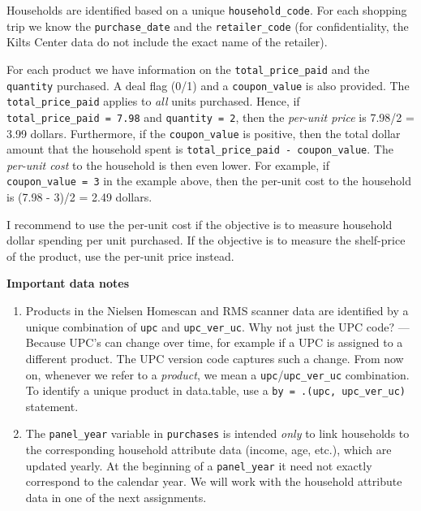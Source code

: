 \documentclass[
]{article}
\begin{document}
Households are identified based on a unique \texttt{household\_code}.
For each shopping trip we know the \texttt{purchase\_date} and the
\texttt{retailer\_code} (for confidentiality, the Kilts Center data do
not include the exact name of the retailer).

For each product we have information on the \texttt{total\_price\_paid}
and the \texttt{quantity} purchased. A deal flag (0/1) and a
\texttt{coupon\_value} is also provided. The \texttt{total\_price\_paid}
applies to \emph{all} units purchased. Hence, if
\texttt{total\_price\_paid\ =\ 7.98} and \texttt{quantity\ =\ 2}, then
the \emph{per-unit price} is 7.98/2 = 3.99 dollars. Furthermore, if the
\texttt{coupon\_value} is positive, then the total dollar amount that
the household spent is \texttt{total\_price\_paid\ -\ coupon\_value}.
The \emph{per-unit cost} to the household is then even lower. For
example, if \texttt{coupon\_value\ =\ 3} in the example above, then the
per-unit cost to the household is (7.98 - 3)/2 = 2.49 dollars.

I recommend to use the per-unit cost if the objective is to measure
household dollar spending per unit purchased. If the objective is to
measure the shelf-price of the product, use the per-unit price instead.

\bigskip

\textbf{Important data notes}

\begin{enumerate}
\def\labelenumi{\arabic{enumi}.}
\item
  Products in the Nielsen Homescan and RMS scanner data are identified
  by a unique combination of \texttt{upc} and \texttt{upc\_ver\_uc}. Why
  not just the UPC code? --- Because UPC's can change over time, for
  example if a UPC is assigned to a different product. The UPC version
  code captures such a change. From now on, whenever we refer to a
  \emph{product}, we mean a \texttt{upc}/\texttt{upc\_ver\_uc}
  combination. To identify a unique product in data.table, use a
  \texttt{by\ =\ .(upc,\ upc\_ver\_uc)} statement.
\item
  The \texttt{panel\_year} variable in \texttt{purchases} is intended
  \emph{only} to link households to the corresponding household
  attribute data (income, age, etc.), which are updated yearly. At the
  beginning of a \texttt{panel\_year} it need not exactly correspond to
  the calendar year. We will work with the household attribute data in
  one of the next assignments.
\end{enumerate}
\end{document}
